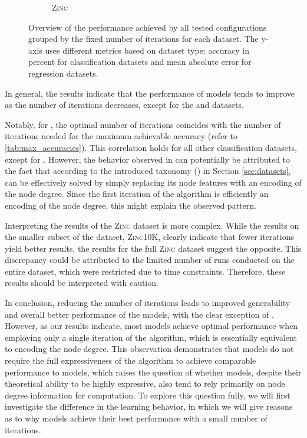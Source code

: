 \begin{figure}[thb]
\begin{subfigure}[b]{0.19\textwidth}
        \caption{\scriptsize\textsc{Zinc}}
	\end{subfigure}
	\caption{Overview of the performance achieved by all tested \wlnn configurations grouped by the fixed number of \wl iterations for each dataset. The y-axis uses different metrics based on dataset type: accuracy in percent for classification datasets and mean absolute error for regression datasets.}
	\label{fig:k_wl_dependence}
\end{figure}

In general, the results indicate that the performance of \wlnn models tends to improve as the number of \wl iterations decreases, except for the \nci and \zinc datasets. 

Notably, for \nci, the optimal number of iterations coincides with the number of \wl iterations needed for the maximum achievable accuracy (refer to \cref{tab:max_accuracies}). This correlation holds for all other classification datasets, except for \mutag. However, the behavior observed in \mutag can potentially be attributed to the fact that according to the introduced taxonomy (\cite{Liu2022}) in Section \ref{sec:datasets}, \mutag can be effectively solved by simply replacing its node features with an encoding of the node degree. Since the first iteration of the \wl algorithm is efficiently an encoding of the node degree, this might explain the observed pattern.

Interpreting the results of the \textsc{Zinc} dataset is more complex. While the results on the smaller subset of the dataset, \textsc{Zinc10K}, clearly indicate that fewer \wl iterations yield better results, the results for the full \textsc{Zinc} dataset suggest the opposite. This discrepancy could be attributed to the limited number of runs conducted on the entire dataset, which were restricted due to time constraints. Therefore, these results should be interpreted with caution.

In conclusion, reducing the number of \wl iterations leads to improved generability and overall better performance of the models, with the clear exception of \nci. However, as our results indicate, most \wlnn models achieve optimal performance when employing only a single iteration of the \wl algorithm, which is essentially equivalent to encoding the node degree. This observation demonstrates that \wlnn models do not require the full expressiveness of the \wl algorithm to achieve comparable performance to \gnn models, which raises the question of whether \gnn models, despite their theoretical ability to be highly expressive, also tend to rely primarily on node degree information for computation. To explore this question fully, we will first investigate the difference in the learning behavior, in which we will give reasons as to why \wlnn models achieve their best performance with a small number of \wl iterations.

